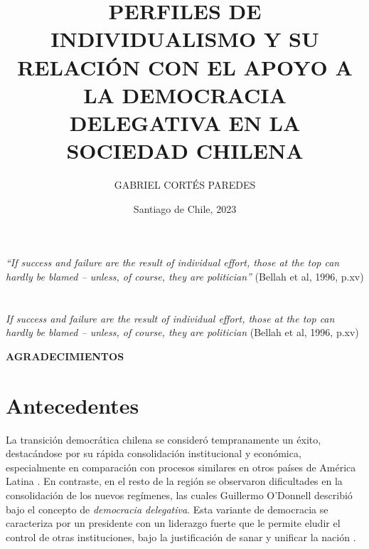 \documentclass[12pt,twoside]{templates/facsothesis}
\title{PERFILES DE INDIVIDUALISMO Y SU RELACIÓN CON EL APOYO A LA DEMOCRACIA DELEGATIVA EN LA SOCIEDAD CHILENA}
\author{GABRIEL CORTÉS PAREDES}
\date{Santiago de Chile, 2023}
\begin{document}
\raggedbottom

  \maketitle

\frontmatter %
 \pagestyle{empty} 


  \begin{prefacio}
  \thispagestyle{empty}
    \emph{``If success and failure are the result of individual effort, those at the top can hardly be blamed -- unless, of course, they are politician''} (Bellah et al, 1996, p.xv)
  \end{prefacio}

  \setcounter{tocdepth}{1}
  \setlength{\parskip}{0pt}
  \tableofcontents
  \thispagestyle{empty}

\setlength\parskip{1em plus 0.1em minus 0.2em}

  \listoftables
  \thispagestyle{empty}

  \listoffigures
  \thispagestyle{empty}



\mainmatter %
\titleformat{\chapter}{\normalfont\Huge\bfseries}{\thechapter}{1em}{}
\pagestyle{fancyplain} %

\hypertarget{section}{%
\chapter*{}\label{section}}

\emph{If success and failure are the result of individual effort, those at the top can hardly be blamed -- unless, of course, they are politician} (Bellah et al, 1996, p.xv)

\textbf{AGRADECIMIENTOS}

\hypertarget{antecedentes}{%
\chapter{Antecedentes}\label{antecedentes}}

La transición democrática chilena se consideró tempranamente un éxito, destacándose por su rápida consolidación institucional y económica, especialmente en comparación con procesos similares en otros países de América Latina \citep{odonnell1994}. En contraste, en el resto de la región se observaron dificultades en la consolidación de los nuevos regímenes, las cuales Guillermo O'Donnell \citeyearpar{odonnell1994} describió bajo el concepto de \emph{democracia delegativa}. Esta variante de democracia se caracteriza por un presidente con un liderazgo fuerte que le permite eludir el control de otras instituciones, bajo la justificación de sanar y unificar la nación \citep{odonnell1994}.
\end{document}
